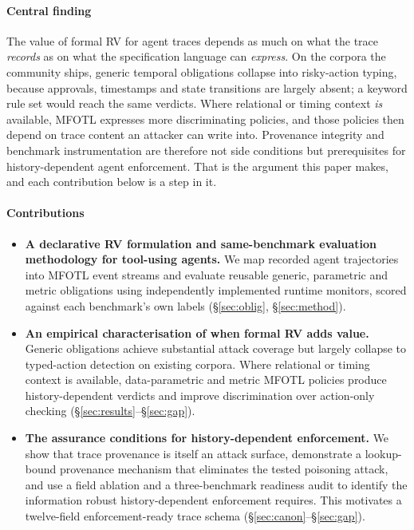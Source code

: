 \documentclass[sigconf]{acmart}
\begin{document}
\paragraph{Central finding} The value of formal RV for agent traces depends as much on
what the trace \emph{records} as on what the specification language can \emph{express}.
On the corpora the community ships, generic temporal obligations collapse into
risky-action typing, because approvals, timestamps and state transitions are largely
absent; a keyword rule set would reach the same verdicts. Where relational or timing
context \emph{is} available, MFOTL expresses more discriminating policies, and
those policies then depend on trace content an attacker can write into. Provenance
integrity and benchmark instrumentation are therefore not side conditions but
prerequisites for history-dependent agent enforcement. That is the argument this paper
makes, and each contribution below is a step in it.

\paragraph{Contributions}
\begin{itemize}
\item \textbf{A declarative RV formulation and same-benchmark evaluation methodology
      for tool-using agents.} We map recorded agent trajectories into MFOTL event
      streams and evaluate reusable generic, parametric and metric obligations using
      independently implemented runtime monitors, scored against each benchmark's own
      labels (\S\ref{sec:oblig}, \S\ref{sec:method}).
\item \textbf{An empirical characterisation of when formal RV adds value.} Generic
      obligations achieve substantial attack coverage but largely collapse to
      typed-action detection on existing corpora. Where relational or timing context is
      available, data-parametric and metric MFOTL policies produce
      history-dependent verdicts and improve discrimination over action-only checking
      (\S\ref{sec:results}--\S\ref{sec:gap}).
\item \textbf{The assurance conditions for history-dependent enforcement.} We show that
      trace provenance is itself an attack surface, demonstrate a lookup-bound
      provenance mechanism that eliminates the tested poisoning attack, and use a field
      ablation and a three-benchmark readiness audit to identify the information robust
      history-dependent enforcement requires. This motivates a twelve-field
      enforcement-ready trace schema (\S\ref{sec:canon}--\S\ref{sec:gap}).
\end{itemize}
\end{document}
